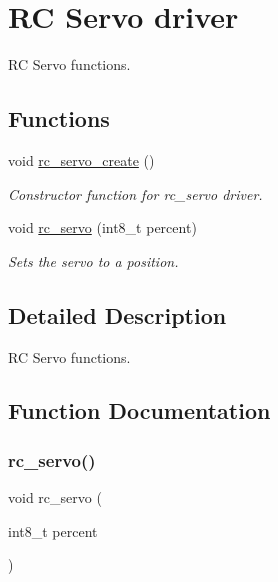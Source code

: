 \hypertarget{group__rc__servo}{}\section{RC Servo driver}
\label{group__rc__servo}


RC Servo functions.  


\subsection*{Functions}
\begin{DoxyCompactItemize}
\item 
void \mbox{\hyperlink{group__rc__servo_ga5ff21bd667dd34d74d363cb84d8d6626}{rc\+\_\+servo\+\_\+create}} ()
\begin{DoxyCompactList}\small\item\em Constructor function for rc\+\_\+servo driver. \end{DoxyCompactList}\item 
void \mbox{\hyperlink{group__rc__servo_ga9965d379cdb28b35126dcb75adf400c3}{rc\+\_\+servo}} (int8\+\_\+t percent)
\begin{DoxyCompactList}\small\item\em Sets the servo to a position. \end{DoxyCompactList}\end{DoxyCompactItemize}


\subsection{Detailed Description}
RC Servo functions. 



\subsection{Function Documentation}
\mbox{\label{group__rc__servo_ga9965d379cdb28b35126dcb75adf400c3}} 
\subsubsection{\texorpdfstring{rc\+\_\+servo()}{rc\_servo()}}
{\footnotesize\ttfamily void rc\+\_\+servo (\begin{DoxyParamCaption}\item[{int8\+\_\+t}]{percent }\end{DoxyParamCaption})}



